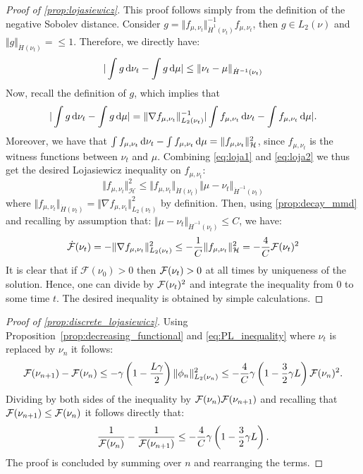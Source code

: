 \begin{proof}[Proof of \cref{prop:lojasiewicz}]\label{proof:prop:lojasiewicz}
	This proof follows simply from the definition of the negative Sobolev distance. Consider $g = \Vert f_{\mu, \nu_t}\Vert^{-1}_{\dot{H}^1(\nu_t)} f_{\mu, \nu_t}$, then $g\in L_2(\nu)$ and $\Vert g \Vert_{\dot{H}(\nu_t)}= \leq 1$. Therefore, we directly have:
	\begin{align}\label{eq:loja1}
	\vert \int g \mathop{}\!\mathrm{d} \nu_t - \int g \mathop{}\!\mathrm{d} \mu  \vert \leq \Vert \nu_t - \mu\Vert_{\dot{H}^{-1}(\nu_t)} 
	\end{align}
	Now, recall the definition of $g$, which implies that
	\begin{equation}\label{eq:loja2}
	\vert \int g \mathop{}\!\mathrm{d} \nu_t - \int g \mathop{}\!\mathrm{d} \mu  \vert = \Vert \nabla f_{\mu, \nu_t}\Vert^{-1}_{L_2(\nu_t)} \vert \int f_{\mu, \nu_t}\mathop{}\!\mathrm{d} \nu_t-\int f_{\mu, \nu_t} \mathop{}\!\mathrm{d} \mu \vert.
	\end{equation}
	Moreover,  we have that $\int f_{\mu, \nu_t}\mathop{}\!\mathrm{d} \nu_t-\int f_{\mu,\nu_t}\mathop{}\!\mathrm{d} \mu = \Vert f_{\mu, \nu_t}\Vert^2_{{{\mathcal H}}}$, since $f_{\mu, \nu_t}$  is the witness functions between $\nu_t$ and $\mu$. Combining \eqref{eq:loja1} and \eqref{eq:loja2} we thus get the desired Lojasiewicz inequality on $f_{\mu,\nu_t}$:
	\begin{equation}
	\Vert f_{\mu,\nu_t} \Vert^2_{\mathcal{H}} \leq \Vert f_{\mu,\nu_t} \Vert_{\dot{H}(\nu_t)} \Vert  \mu -\nu_t\Vert_{\dot{H}^{-1}(\nu_t)}  
	\end{equation}
	where $\Vert f_{\mu,\nu_t} \Vert_{\dot{H}(\nu_t)}=\Vert \nabla f_{\mu, \nu_t} \Vert^2_{L_2(\nu_t)}$ by definition. Then, 
	using \cref{prop:decay_mmd} and recalling by assumption that: $\Vert \mu - \nu_t \Vert_{\dot{H}^{-1}(\nu_t)} \le C$, we have:  
	\begin{align}\label{eq:PL_inequality}
	\dot{{{\mathcal F}}}(\nu_t) = - \Vert \nabla f_{\mu, \nu_t} \Vert^2_{L_2(\nu_t)} \leq -\frac{1}{C}\Vert f_{\mu,\nu_t} \Vert^2_{\mathcal{H}}= -\frac{4}{C}{{\mathcal F}}(\nu_t)^2	
	\end{align}
	It is clear that if $\mathcal{F}(\nu_0)>0$ then ${{\mathcal F}}(\nu_t)>0$ at all times by uniqueness of the solution. Hence, one can divide by ${{\mathcal F}}(\nu_t)^2$ and integrate the inequality from $0$ to some time $t$. The desired inequality is obtained by simple calculations.
\end{proof}

\begin{proof}[Proof of \cref{prop:discrete_lojasiewicz}]\label{proof:prop:discrete_lojasiewicz}
Using Proposition~\cref{prop:decreasing_functional} and \cref{eq:PL_inequality} where $\nu_t$ is replaced by $\nu_n$ it follows:
$$
{{\mathcal F}}(\nu_{n+1}) - {{\mathcal F}}(\nu_n) \leq -\gamma\left(1-\frac{L\gamma}{2}\right)\|\phi_n\|_{L_2(\nu_n)}^2 \leq -\frac{4}{C}\gamma\left(1-\frac{3}{2}\gamma L\right){{\mathcal F}}(\nu_n)^2.
$$
Dividing by both sides of the inequality by  $ {{\mathcal F}}(\nu_n){{\mathcal F}}(\nu_{n+1})$ and recalling that ${{\mathcal F}}(\nu_{n+1})\leq {{\mathcal F}}(\nu_n)$ it follows directly that: 
$$\frac{1}{{{\mathcal F}}(\nu_n)} - \frac{1}{{{\mathcal F}}(\nu_{n+1})} \leq -\frac{4}{C}\gamma\left(1-\frac{3}{2}\gamma L\right).$$ The proof is concluded by summing over $n$ and rearranging the terms. 
\end{proof}

